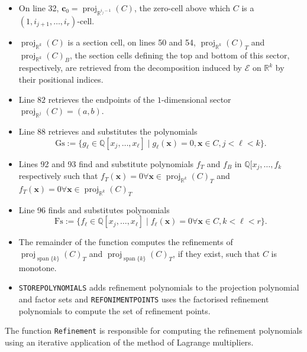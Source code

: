 \documentclass[
]{book}
\providecommand{\tightlist}{%
  \setlength{\itemsep}{0pt}\setlength{\parskip}{0pt}}
\theoremstyle{definition}
\theoremstyle{definition}
\theoremstyle{definition}
\theoremstyle{definition}
\theoremstyle{remark}
\begin{document}
\begin{itemize}
\tightlist
\item
  On line 32, \(\mathbf{c}_0 = {\operatorname{proj}_{\mathbb{R}^{i_j - 1}}}(C)\), the zero-cell above which \(C\) is a \((1,i_{j+1},\ldots,i_r)\)-cell.
\item
  \({\operatorname{proj}_{\mathbb{R}^{k}}}(C)\) is a section cell, on lines 50 and 54, \({\operatorname{proj}_{\mathbb{R}^{k}}}(C)_T\) and \({\operatorname{proj}_{\mathbb{R}^{k}}}(C)_B\), the section cells defining the top and bottom of this sector, respectively, are retrieved from the decomposition induced by \(\mathcal{E}\) on \(\mathbb{R}^k\) by their positional indices.
\item
  Line \(82\) retrieves the endpoints of the \(1\)-dimensional sector \({\operatorname{proj}_{\mathbb{R}^{j}}}(C) = (a,b)\).
\item
  Line 88 retrieves and substitutes the polynomials
  \[
  \mathrm{Gs} := \{ g_\ell \in \mathbb{Q}[x_j,\ldots,x_\ell] \mid g_\ell(\mathbf{x}) = 0, \mathbf{x} \in C, j < \ell < k \}.
  \]
\item
  Lines 92 and 93 find and substitute polynomials \(f_T\) and \(f_B\) in \(\mathbb{Q}[x_j, \ldots, f_k\) respectively such that \(f_T(\mathbf{x}) = 0 \forall \mathbf{x} \in {\operatorname{proj}_{\mathbb{R}^{k}}}(C)_T\) and \(f_T(\mathbf{x}) = 0 \forall \mathbf{x} \in {\operatorname{proj}_{\mathbb{R}^{k}}}(C)_T\)
\item
  Line 96 finds and substitutes polynomials
  \[
  \mathrm{Fs} := \{ f_\ell \in \mathbb{Q}[x_j,\ldots,x_\ell] \mid f_\ell(\mathbf{x}) = 0 \forall \mathbf{x} \in C, k < \ell < r \}.
  \]
\item
  The remainder of the function computes the refinements of \({\operatorname{proj}_{{\operatorname{span} \{k\}}}}(C)_T\) and \({\operatorname{proj}_{{\operatorname{span} \{k\}}}}(C)_T\), if they exist, such that \(C\) is monotone.
\item
  \texttt{STOREPOLYNOMIALS} adds refinement polynomials to the projection polynomial and factor sets and \texttt{REFONIMENTPOINTS} uses the factorised refinement polynomials to compute the set of refinement points.
\end{itemize}

The function \texttt{Refinement} is responsible for computing the refinement polynomials using an iterative application of the method of Lagrange multipliers.
\end{document}
